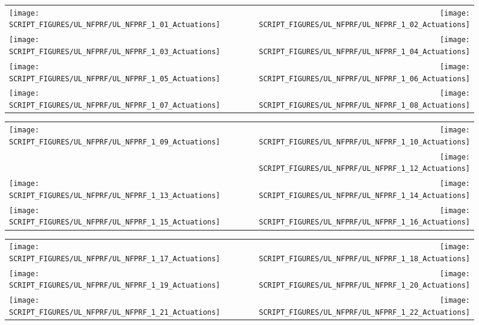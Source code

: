 \newpage

\begin{figure}[p]
\begin{tabular*}{\textwidth}{l@{\extracolsep{\fill}}r}
\texttt{[image: SCRIPT\_FIGURES/UL\_NFPRF/UL\_NFPRF\_1\_01\_Actuations]} &
\texttt{[image: SCRIPT\_FIGURES/UL\_NFPRF/UL\_NFPRF\_1\_02\_Actuations]} \\
\texttt{[image: SCRIPT\_FIGURES/UL\_NFPRF/UL\_NFPRF\_1\_03\_Actuations]} &
\texttt{[image: SCRIPT\_FIGURES/UL\_NFPRF/UL\_NFPRF\_1\_04\_Actuations]} \\
\texttt{[image: SCRIPT\_FIGURES/UL\_NFPRF/UL\_NFPRF\_1\_05\_Actuations]} &
\texttt{[image: SCRIPT\_FIGURES/UL\_NFPRF/UL\_NFPRF\_1\_06\_Actuations]} \\
\texttt{[image: SCRIPT\_FIGURES/UL\_NFPRF/UL\_NFPRF\_1\_07\_Actuations]} &
\texttt{[image: SCRIPT\_FIGURES/UL\_NFPRF/UL\_NFPRF\_1\_08\_Actuations]} \\
\end{tabular*}
\label{UL_NFPRF_1}
\end{figure}

\begin{figure}[p]
\begin{tabular*}{\textwidth}{l@{\extracolsep{\fill}}r}
\texttt{[image: SCRIPT\_FIGURES/UL\_NFPRF/UL\_NFPRF\_1\_09\_Actuations]} &
\texttt{[image: SCRIPT\_FIGURES/UL\_NFPRF/UL\_NFPRF\_1\_10\_Actuations]} \\
&
\texttt{[image: SCRIPT\_FIGURES/UL\_NFPRF/UL\_NFPRF\_1\_12\_Actuations]} \\
\texttt{[image: SCRIPT\_FIGURES/UL\_NFPRF/UL\_NFPRF\_1\_13\_Actuations]} &
\texttt{[image: SCRIPT\_FIGURES/UL\_NFPRF/UL\_NFPRF\_1\_14\_Actuations]} \\
\texttt{[image: SCRIPT\_FIGURES/UL\_NFPRF/UL\_NFPRF\_1\_15\_Actuations]} &
\texttt{[image: SCRIPT\_FIGURES/UL\_NFPRF/UL\_NFPRF\_1\_16\_Actuations]} \\
\end{tabular*}
\label{UL_NFPRF_2}
\end{figure}

\begin{figure}[p]
\begin{tabular*}{\textwidth}{l@{\extracolsep{\fill}}r}
\texttt{[image: SCRIPT\_FIGURES/UL\_NFPRF/UL\_NFPRF\_1\_17\_Actuations]} &
\texttt{[image: SCRIPT\_FIGURES/UL\_NFPRF/UL\_NFPRF\_1\_18\_Actuations]} \\
\texttt{[image: SCRIPT\_FIGURES/UL\_NFPRF/UL\_NFPRF\_1\_19\_Actuations]} &
\texttt{[image: SCRIPT\_FIGURES/UL\_NFPRF/UL\_NFPRF\_1\_20\_Actuations]} \\
\texttt{[image: SCRIPT\_FIGURES/UL\_NFPRF/UL\_NFPRF\_1\_21\_Actuations]} &
\texttt{[image: SCRIPT\_FIGURES/UL\_NFPRF/UL\_NFPRF\_1\_22\_Actuations]}
\end{tabular*}
\label{UL_NFPRF_3}
\end{figure}

